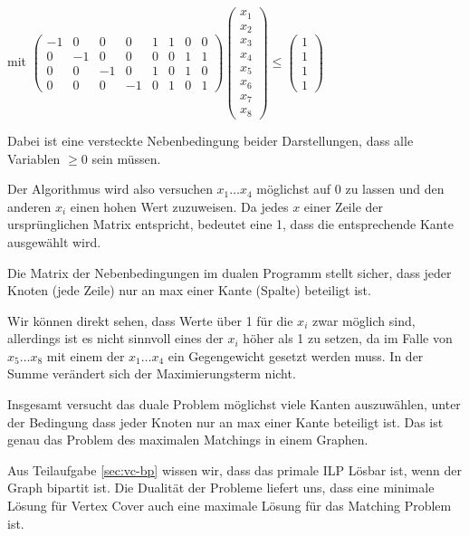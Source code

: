 mit 
$
\begin{pmatrix}
-1& 0 & 0 & 0 & 1 & 1 & 0 & 0 \\
0 &-1 & 0 & 0 & 0 & 0 & 1 & 1 \\
0 & 0 &-1 & 0 & 1 & 0 & 1 & 0 \\
0 & 0 & 0 &-1 & 0 & 1 & 0 & 1
\end{pmatrix}
\begin{pmatrix} x_1 \\ x_2 \\ x_3 \\ x_4 \\ x_5 \\ x_6 \\ x_7 \\ x_8 \end{pmatrix}
	\leq
\begin{pmatrix} 1 \\ 1 \\ 1 \\ 1 \end{pmatrix}$

Dabei ist eine versteckte Nebenbedingung beider Darstellungen, dass alle Variablen $\geq 0$ sein müssen.

Der Algorithmus wird also versuchen $x_1 \dots x_4$ möglichst auf 0 zu lassen und den anderen $x_i$ einen hohen Wert zuzuweisen. Da jedes $x$ einer Zeile der ursprünglichen Matrix entspricht, bedeutet eine 1, dass die entsprechende Kante ausgewählt wird.

Die Matrix der Nebenbedingungen im dualen Programm stellt sicher, dass jeder Knoten (jede Zeile) nur an max einer Kante (Spalte) beteiligt ist.

Wir können direkt sehen, dass Werte über 1 für die $x_i$ zwar möglich sind, allerdings ist es nicht sinnvoll eines der $x_i$ höher als 1 zu setzen, da im Falle von $x_5 \dots x_8$ mit einem der $x_1 \dots x_4$ ein Gegengewicht gesetzt werden muss. In der Summe verändert sich der Maximierungsterm nicht.

Insgesamt versucht das duale Problem möglichst viele Kanten auszuwählen, unter der Bedingung dass jeder Knoten nur an max einer Kante beteiligt ist. Das ist genau das Problem des maximalen Matchings in einem Graphen.

Aus Teilaufgabe \ref{sec:vc-bp} wissen wir, dass das primale ILP Lösbar ist, wenn der Graph bipartit ist. Die Dualität der Probleme liefert uns, dass eine minimale Lösung für Vertex Cover auch eine maximale Lösung für das Matching Problem ist.
